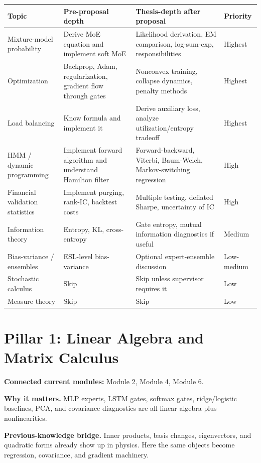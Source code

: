 \documentclass[11pt]{article}
\begin{document}
\small
\begin{longtable}{>{\raggedright\arraybackslash}p{} >{\raggedright\arraybackslash}p{} >{\raggedright\arraybackslash}p{} >{\raggedright\arraybackslash}p{}}
\textbf{Topic} & \textbf{Pre-proposal depth} & \textbf{Thesis-depth after proposal} & \textbf{Priority} \\
\hline
Mixture-model probability & Derive MoE equation and implement soft MoE & Likelihood derivation, EM comparison, log-sum-exp, responsibilities & Highest \\
Optimization & Backprop, Adam, regularization, gradient flow through gates & Nonconvex training, collapse dynamics, penalty methods & Highest \\
Load balancing & Know formula and implement it & Derive auxiliary loss, analyze utilization/entropy tradeoff & Highest \\
HMM / dynamic programming & Implement forward algorithm and understand Hamilton filter & Forward-backward, Viterbi, Baum-Welch, Markov-switching regression & High \\
Financial validation statistics & Implement purging, rank-IC, backtest costs & Multiple testing, deflated Sharpe, uncertainty of IC & High \\
Information theory & Entropy, KL, cross-entropy & Gate entropy, mutual information diagnostics if useful & Medium \\
Bias-variance / ensembles & ESL-level bias-variance & Optional expert-ensemble discussion & Low-medium \\
Stochastic calculus & Skip & Skip unless supervisor requires it & Low \\
Measure theory & Skip & Skip & Low \\
\end{longtable}
\normalsize

\section{Pillar 1: Linear Algebra and Matrix Calculus}

\textbf{Connected current modules:} Module 2, Module 4, Module 6.

\textbf{Why it matters.} MLP experts, LSTM gates, softmax gates, ridge/logistic baselines, PCA, and covariance diagnostics are all linear algebra plus nonlinearities.

\textbf{Previous-knowledge bridge.} Inner products, basis changes, eigenvectors, and quadratic forms already show up in physics. Here the same objects become regression, covariance, and gradient machinery.
\end{document}
